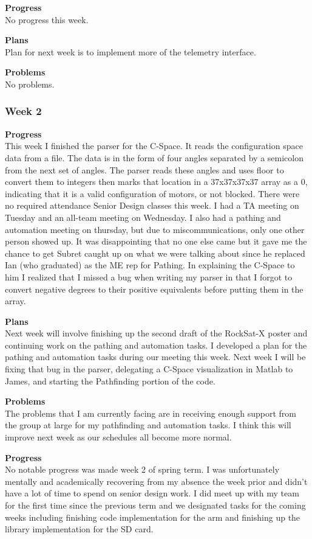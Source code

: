 \textbf{Progress} \\
No progress this week.

\textbf{Plans} \\
Plan for next week is to implement more of the telemetry interface.

\textbf{Problems} \\
No problems.

\subsubsection{Week 2}
\textbf{Progress} \\
This week I finished the parser for the C-Space. It reads the configuration space data from a file. The data is in the form of four angles separated by a semicolon from the next set of angles. The parser reads these angles and uses floor to convert them to integers then marks that location in a 37x37x37x37 array as a 0, indicating that it is a valid configuration of motors, or not blocked. There were no required attendance Senior Design classes this week. I had a TA meeting on Tuesday and an all-team meeting on Wednesday. I also had a pathing and automation meeting on thursday, but due to miscommunications, only one other person showed up. It was disappointing that no one else came but it gave me the chance to get Subret caught up on what we were talking about since he replaced Ian (who graduated) as the ME rep for Pathing. In explaining the C-Space to him I realized that I missed a bug when writing my parser in that I forgot to convert negative degrees to their positive equivalents before putting them in the array.

\textbf{Plans} \\
Next week will involve finishing up the second draft of the RockSat-X poster and continuing work on the pathing and automation tasks. I developed a plan for the pathing and automation tasks during our meeting this week. Next week I will be fixing that bug in the parser, delegating a C-Space visualization in Matlab to James, and starting the Pathfinding portion of the code.

\textbf{Problems} \\
The problems that I am currently facing are in receiving enough support from the group at large for my pathfinding and automation tasks. I think this will improve next week as our schedules all become more normal.

\textbf{Progress} \\
No notable progress was made week 2 of spring term. I was unfortunately mentally and academically recovering from my absence the week prior and didn't 
have a lot of time to spend on senior design work. I did meet up with my team for the first time since the previous term and we designated tasks for the 
coming weeks including finishing code implementation for the arm and finishing up the library implementation for the SD card.

